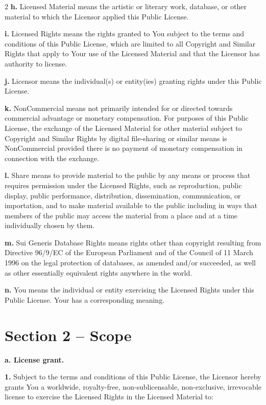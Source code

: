 \begin{multicols*}{2}
    \textbf{h.} Licensed Material means the artistic or literary work, database,
    or other material to which the Licensor applied this Public License.

    \textbf{i.} Licensed Rights means the rights granted to You subject to the
    terms and conditions of this Public License, which are limited to all
    Copyright and Similar Rights that apply to Your use of the Licensed
    Material and that the Licensor has authority to license.

    \textbf{j.} Licensor means the individual(s) or entity(ies) granting rights
    under this Public License.

    \textbf{k.} NonCommercial means not primarily intended for or directed
    towards commercial advantage or monetary compensation. For purposes of
    this Public License, the exchange of the Licensed Material for other
    material subject to Copyright and Similar Rights by digital file-sharing
    or similar means is NonCommercial provided there is no payment of
    monetary compensation in connection with the exchange.

    \textbf{l.} Share means to provide material to the public by any means or
    process that requires permission under the Licensed Rights, such as
    reproduction, public display, public performance, distribution,
    dissemination, communication, or importation, and to make material
    available to the public including in ways that members of the public
    may access the material from a place and at a time individually chosen
    by them.

    \textbf{m.} Sui Generis Database Rights means rights other than copyright
    resulting from Directive 96/9/EC of the European Parliament and of the
    Council of 11 March 1996 on the legal protection of databases, as
    amended and/or succeeded, as well as other essentially equivalent
    rights anywhere in the world.

    \textbf{n.} You means the individual or entity exercising the Licensed Rights
    under this Public License. Your has a corresponding meaning.


    \section*{Section 2 -- Scope}

    \textbf{a. License grant.}

    \textbf{1.} Subject to the terms and conditions of this Public License, the
    Licensor hereby grants You a worldwide, royalty-free,
    non-sublicensable, non-exclusive, irrevocable license to exercise the
    Licensed Rights in the Licensed Material to:


\end{multicols*}
